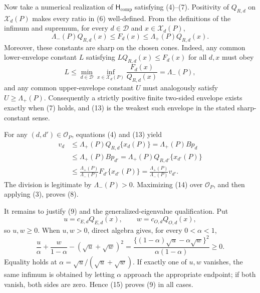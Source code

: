 Now take a numerical realization of \(\mathsf H_{\mathrm{comp}}\) satisfying (4)--(7).  Positivity of \(Q_{R,d}\) on \(\mathcal X_d(P)\) makes every ratio in (6) well-defined.  From the definitions of the infimum and supremum, for every \(d\in\mathcal D\) and \(x\in\mathcal X_d(P)\),
\[
 \Lambda_-(P)Q_{R,d}(x)
 \le F_d(x)
 \le\Lambda_+(P)Q_{R,d}(x).                                \tag{13}
\]
Moreover, these constants are sharp on the chosen cones.  Indeed, any common lower-envelope constant \(L\) satisfying \(LQ_{R,d}(x)\le F_d(x)\) for all \(d,x\) must obey
\[
 L\le\min_{d\in\mathcal D}\inf_{x\in\mathcal X_d(P)}
       \frac{F_d(x)}{Q_{R,d}(x)}=\Lambda_-(P),
\]
and any common upper-envelope constant \(U\) must analogously satisfy \(U\ge\Lambda_+(P)\).  Consequently a strictly positive finite two-sided envelope exists exactly when (7) holds, and (13) is the weakest such envelope in the stated sharp-constant sense.

For any \((d,d')\in\mathcal O_P\), equations (4) and (13) yield
\[
\begin{aligned}
 v_d
 &\le\Lambda_+(P)Q_{R,d}\{x_d(P)\}
   =\Lambda_+(P)Bp_d\\
 &\le\Lambda_+(P)Bp_{d'}
   =\Lambda_+(P)Q_{R,d'}\{x_{d'}(P)\}\\
 &\le\frac{\Lambda_+(P)}{\Lambda_-(P)}
       F_{d'}\{x_{d'}(P)\}
   =\frac{\Lambda_+(P)}{\Lambda_-(P)}v_{d'}.
\end{aligned}                                                \tag{14}
\]
The division is legitimate by \(\Lambda_-(P)>0\).  Maximizing (14) over \(\mathcal O_P\), and then applying (3), proves (8).

It remains to justify (9) and the generalized-eigenvalue qualification.  Put
\[
 u=c_{E,d}Q_{E,d}(x),
 \qquad
 w=c_{O,d}Q_{O,d}(x),
\]
so \(u,w\ge0\).  When \(u,w>0\), direct algebra gives, for every \(0<\alpha<1\),
\[
 \frac{u}{\alpha}+\frac{w}{1-\alpha}
 -(\sqrt u+\sqrt w)^2
 =\frac{\{(1-\alpha)\sqrt u-\alpha\sqrt w\}^2}
        {\alpha(1-\alpha)}\ge0.                              \tag{15}
\]
Equality holds at \(\alpha=\sqrt u/(\sqrt u+\sqrt w)\).  If exactly one of \(u,w\) vanishes, the same infimum is obtained by letting \(\alpha\) approach the appropriate endpoint; if both vanish, both sides are zero.  Hence (15) proves (9) in all cases.

